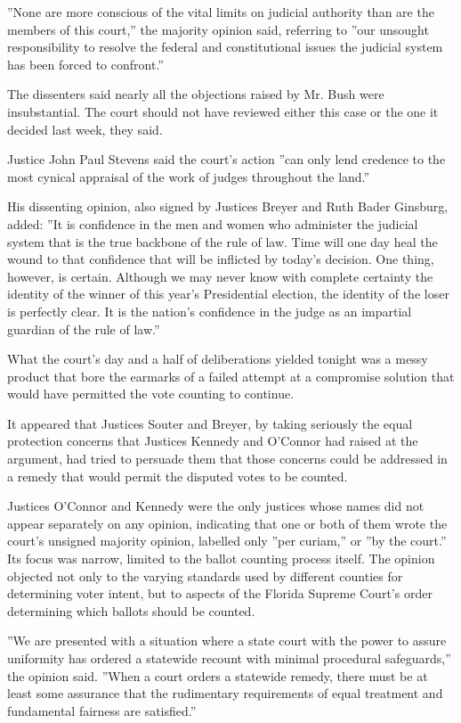 ''None are more conscious of the vital limits on judicial authority than
are the members of this court,'' the majority opinion said, referring to
''our unsought responsibility to resolve the federal and constitutional
issues the judicial system has been forced to confront.''

The dissenters said nearly all the objections raised by Mr. Bush were
insubstantial. The court should not have reviewed either this case or
the one it decided last week, they said.

Justice John Paul Stevens said the court's action ''can only lend
credence to the most cynical appraisal of the work of judges throughout
the land.''

His dissenting opinion, also signed by Justices Breyer and Ruth Bader
Ginsburg, added: ''It is confidence in the men and women who administer
the judicial system that is the true backbone of the rule of law. Time
will one day heal the wound to that confidence that will be inflicted by
today's decision. One thing, however, is certain. Although we may never
know with complete certainty the identity of the winner of this year's
Presidential election, the identity of the loser is perfectly clear. It
is the nation's confidence in the judge as an impartial guardian of the
rule of law.''

What the court's day and a half of deliberations yielded tonight was a
messy product that bore the earmarks of a failed attempt at a compromise
solution that would have permitted the vote counting to continue.

It appeared that Justices Souter and Breyer, by taking seriously the
equal protection concerns that Justices Kennedy and O'Connor had raised
at the argument, had tried to persuade them that those concerns could be
addressed in a remedy that would permit the disputed votes to be
counted.

Justices O'Connor and Kennedy were the only justices whose names did not
appear separately on any opinion, indicating that one or both of them
wrote the court's unsigned majority opinion, labelled only ''per
curiam,'' or ''by the court.'' Its focus was narrow, limited to the
ballot counting process itself. The opinion objected not only to the
varying standards used by different counties for determining voter
intent, but to aspects of the Florida Supreme Court's order determining
which ballots should be counted.

''We are presented with a situation where a state court with the power
to assure uniformity has ordered a statewide recount with minimal
procedural safeguards,'' the opinion said. ''When a court orders a
statewide remedy, there must be at least some assurance that the
rudimentary requirements of equal treatment and fundamental fairness are
satisfied.''

